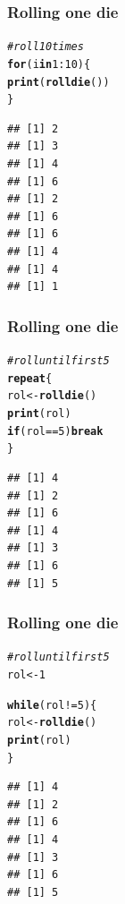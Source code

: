 \documentclass[12pt]{beamer}\usepackage[]{graphicx}\usepackage[]{color}
\makeatletter
\newcommand{\hlnum}[1]{\textcolor[rgb]{0.686,0.059,0.569}{#1}}%
\newcommand{\hlcom}[1]{\textcolor[rgb]{0.678,0.584,0.686}{\textit{#1}}}%
\newcommand{\hlopt}[1]{\textcolor[rgb]{0,0,0}{#1}}%
\newcommand{\hlstd}[1]{\textcolor[rgb]{0.345,0.345,0.345}{#1}}%
\newcommand{\hlkwa}[1]{\textcolor[rgb]{0.161,0.373,0.58}{\textbf{#1}}}%
\newcommand{\hlkwb}[1]{\textcolor[rgb]{0.69,0.353,0.396}{#1}}%
\newcommand{\hlkwd}[1]{\textcolor[rgb]{0.737,0.353,0.396}{\textbf{#1}}}%
\newenvironment{kframe}{%
 \def\at@end@of@kframe{}%
 \ifinner\ifhmode%
  \def\at@end@of@kframe{\end{minipage}}%
  \begin{minipage}{\columnwidth}%
 \fi\fi%
 \def\FrameCommand##1{\hskip\@totalleftmargin \hskip-\fboxsep
 \colorbox{shadecolor}{##1}\hskip-\fboxsep
     \hskip-\linewidth \hskip-\@totalleftmargin \hskip\columnwidth}%
 \MakeFramed {\advance\hsize-\width
   \@totalleftmargin\z@ \linewidth\hsize
   \@setminipage}}%
 {\par\unskip\endMakeFramed%
 \at@end@of@kframe}
\newenvironment{knitrout}{}{} %
\makeatother
\begin{document}

\begin{frame}[fragile]
\frametitle{Rolling one die}
\begin{knitrout}\footnotesize
{}\color{fgcolor}\begin{kframe}
\begin{alltt}
\hlcom{# roll 10 times}
\hlkwa{for} \hlstd{(i} \hlkwa{in} \hlnum{1}\hlopt{:}\hlnum{10}\hlstd{) \{}
  \hlkwd{print}\hlstd{(}\hlkwd{rolldie}\hlstd{())}
\hlstd{\}}
\end{alltt}
\begin{verbatim}
## [1] 2
## [1] 3
## [1] 4
## [1] 6
## [1] 2
## [1] 6
## [1] 6
## [1] 4
## [1] 4
## [1] 1
\end{verbatim}
\end{kframe}
\end{knitrout}

\end{frame}


\begin{frame}[fragile]
\frametitle{Rolling one die}
\begin{knitrout}\footnotesize
{}\color{fgcolor}\begin{kframe}
\begin{alltt}
\hlcom{# roll until first 5}
\hlkwa{repeat} \hlstd{\{}
  \hlstd{rol} \hlkwb{<-} \hlkwd{rolldie}\hlstd{()}
  \hlkwd{print}\hlstd{(rol)}
  \hlkwa{if} \hlstd{(rol} \hlopt{==} \hlnum{5}\hlstd{)} \hlkwa{break}
\hlstd{\}}
\end{alltt}
\begin{verbatim}
## [1] 4
## [1] 2
## [1] 6
## [1] 4
## [1] 3
## [1] 6
## [1] 5
\end{verbatim}
\end{kframe}
\end{knitrout}

\end{frame}


\begin{frame}[fragile]
\frametitle{Rolling one die}
\begin{knitrout}\footnotesize
{}\color{fgcolor}\begin{kframe}
\begin{alltt}
\hlcom{# roll until first 5}
\hlstd{rol} \hlkwb{<-} \hlnum{1}

\hlkwa{while} \hlstd{(rol} \hlopt{!=} \hlnum{5}\hlstd{) \{}
  \hlstd{rol} \hlkwb{<-} \hlkwd{rolldie}\hlstd{()}
  \hlkwd{print}\hlstd{(rol)}
\hlstd{\}}
\end{alltt}
\begin{verbatim}
## [1] 4
## [1] 2
## [1] 6
## [1] 4
## [1] 3
## [1] 6
## [1] 5
\end{verbatim}
\end{kframe}
\end{knitrout}

\end{frame}
\end{document}
